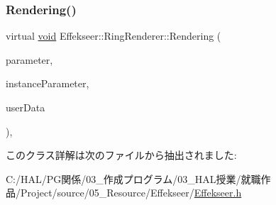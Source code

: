 \subsubsection{\texorpdfstring{Rendering()}{Rendering()}}
{\footnotesize\ttfamily virtual \mbox{\hyperlink{namespace_effekseer_ab34c4088e512200cf4c2716f168deb56}{void}} Effekseer\+::\+Ring\+Renderer\+::\+Rendering (\begin{DoxyParamCaption}\item[{const \mbox{\hyperlink{struct_effekseer_1_1_ring_renderer_1_1_node_parameter}{Node\+Parameter}} \&}]{parameter,  }\item[{const \mbox{\hyperlink{struct_effekseer_1_1_ring_renderer_1_1_instance_parameter}{Instance\+Parameter}} \&}]{instance\+Parameter,  }\item[{\mbox{\hyperlink{namespace_effekseer_ab34c4088e512200cf4c2716f168deb56}{void}} $\ast$}]{user\+Data }\end{DoxyParamCaption})\hspace{0.3cm}{\ttfamily [inline]}, {\ttfamily [virtual]}}



このクラス詳解は次のファイルから抽出されました\+:\begin{DoxyCompactItemize}
\item 
C\+:/\+H\+A\+L/\+P\+G関係/03\+\_\+作成プログラム/03\+\_\+\+H\+A\+L授業/就職作品/\+Project/source/05\+\_\+\+Resource/\+Effekseer/\mbox{\hyperlink{_effekseer_8h}{Effekseer.\+h}}\end{DoxyCompactItemize}
